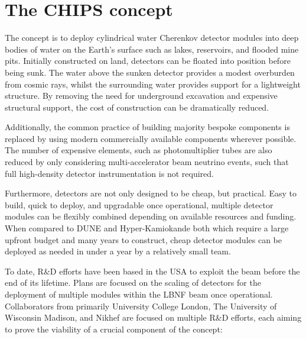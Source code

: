 \section{The CHIPS concept} %
\label{sec:chips_concept} %

The \chips concept is to deploy cylindrical water Cherenkov detector modules into deep bodies of
water on the Earth's surface such as lakes, reservoirs, and flooded mine pits. Initially
constructed on land, \chips detectors can be floated into position before being sunk. The water
above the sunken detector provides a modest overburden from cosmic rays, whilst the surrounding
water provides support for a lightweight structure. By removing the need for underground
excavation and expensive structural support, the cost of construction can be dramatically reduced.

Additionally, the common practice of building majority bespoke components is replaced by using
modern commercially available components wherever possible. The number of expensive elements, such
as photomultiplier tubes are also reduced by only considering multi-\GeV accelerator beam neutrino
events, such that full high-density detector instrumentation is not required.

Furthermore, \chips detectors are not only designed to be cheap, but practical. Easy to build,
quick to deploy, and upgradable once operational, multiple detector modules can be flexibly
combined depending on available resources and funding. When compared to DUNE and Hyper-Kamiokande
both which require a large upfront budget and many years to construct, cheap \chips detector
modules can be deployed as needed in under a year by a relatively small team.

To date, \chips R\&D efforts have been based in the USA to exploit the \numi beam before the end
of its lifetime. Plans are focused on the scaling of \chips detectors for the deployment of
multiple modules within the LBNF beam once operational. Collaborators from primarily University
College London, The University of Wisconsin Madison, and Nikhef are focused on multiple R\&D
efforts, each aiming to prove the viability of a crucial component of the \chips concept:

